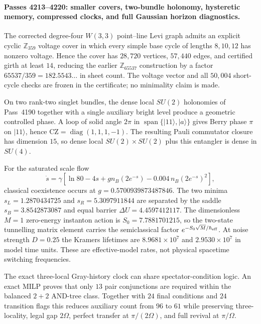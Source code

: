 \providecommand{\rank}{\operatorname{rank}}
\paragraph{Passes 4213--4220: smaller covers, two-bundle holonomy, hysteretic memory, compressed clocks, and full Gaussian horizon diagnostics.}
The corrected degree-four $W(3,3)$ point--line Levi graph admits an explicit cyclic $\mathbb Z_{359}$ voltage cover in which every simple base cycle of lengths $8,10,12$ has nonzero voltage.  Hence the cover has $28{,}720$ vertices, $57{,}440$ edges, and certified girth at least $14$, reducing the earlier $\mathbb Z_{65537}$ construction by a factor $65537/359=182.5543\ldots$ in sheet count.  The voltage vector and all $50{,}004$ short-cycle checks are frozen in the certificate; no minimality claim is made.

On two rank-two singlet bundles, the dense local $SU(2)$ holonomies of Pass~4190 together with a single auxiliary bright level produce a geometric controlled phase.  A loop of solid angle $2\pi$ in $\operatorname{span}\{|11\rangle,|a\rangle\}$ gives Berry phase $\pi$ on $|11\rangle$, hence $\mathrm{CZ}=\operatorname{diag}(1,1,1,-1)$.  The resulting Pauli commutator closure has dimension $15$, so dense local $SU(2)\times SU(2)$ plus this entangler is dense in $SU(4)$.

For the saturated scale flow
\[
 \dot s=\gamma\!\left[\ln80-4s+g n_B(2e^{-s})-0.004\,n_B(2e^{-s})^2\right],
\]
classical coexistence occurs at $g=0.5700939873487846$.  The two minima $s_L=1.2870434725$ and $s_R=5.3097911844$ are separated by the saddle $s_B=3.8542873087$ and equal barrier $\Delta U=4.4597412117$.  The dimensionless $M=1$ zero-energy instanton action is $S_0=7.7881701215$, so the two-state tunnelling matrix element carries the semiclassical factor $e^{-S_0\sqrt M/\hbar_{\rm eff}}$.  At noise strength $D=0.25$ the Kramers lifetimes are $8.9681\times10^7$ and $2.9530\times10^7$ in model time units.  These are effective-model rates, not physical spacetime switching frequencies.

The exact three-local Gray-history clock can share spectator-condition logic.  An exact MILP proves that only $13$ pair conjunctions are required within the balanced $2+2$ AND-tree class.  Together with $24$ final conditions and $24$ transition flags this reduces auxiliary count from $96$ to $61$ while preserving three-locality, legal gap $2\Omega$, perfect transfer at $\pi/(2\Omega)$, and full revival at $\pi/\Omega$.


